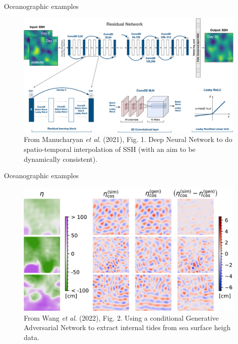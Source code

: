 \documentclass[xcolor=x11names,compress]{beamer}
\renewcommand{\(}{\begin{columns}}
\renewcommand{\)}{\end{columns}}
\newcommand{\<}[1]{\begin{column}{#1}}
\renewcommand{\>}{\end{column}}
\begin{document}

\begin{frame}{Oceanographic examples}

\begin{figure}
  \includegraphics[width=\textwidth]{Manucharyan_et_al_2021_fig1}
  \caption{From Manucharyan \emph{et al}. (2021), Fig. 1. Deep Neural Network to
  do spatio-temporal interpolation of SSH (with an aim to be dynamically
  consistent).}
\end{figure}

\end{frame}


\begin{frame}{Oceanographic examples}

\begin{figure}
  \includegraphics[width=\textwidth]{Wang_et_al_2022_fig2}
  \caption{From Wang \emph{et al}. (2022), Fig. 2. Using a conditional
  Generative Adversarial Network to extract internal tides from sea surface
  heigh data.}
\end{figure}

\end{frame}
\end{document}
